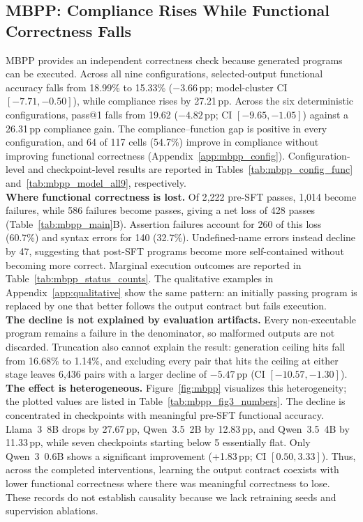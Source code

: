 \documentclass{article}
\newcommand{\pp}{\,pp}
\begin{document}
\vspace{-3mm}
\subsection{MBPP: Compliance Rises While Functional Correctness Falls}
\label{sec:mbpp}
\vspace{-2mm}
MBPP provides an independent correctness check because generated programs can
be executed. Across all nine configurations, selected-output functional
accuracy falls from 18.99\% to 15.33\% ($-3.66$\pp{}; model-cluster CI
$[-7.71,-0.50]$), while compliance rises by 27.21\pp{}. Across the six
deterministic configurations, pass@1 falls from 19.62%
($-4.82$\pp{}; CI $[-9.65,-1.05]$) against a 26.31\pp{} compliance gain.
The compliance--function gap is positive in every configuration, and 64 of
117 cells (54.7\%) improve in compliance without improving functional
correctness (Appendix~\ref{app:mbpp_config}).
Configuration-level and checkpoint-level results are reported in
Tables~\ref{tab:mbpp_config_func} and~\ref{tab:mbpp_model_all9}, respectively.
\\
\noindent\textbf{Where functional correctness is lost.}
Of 2{,}222 pre-SFT passes, 1{,}014 become failures, while 586 failures become
passes, giving a net loss of 428 passes (Table~\ref{tab:mbpp_main}B).
Assertion failures account for 260 of this loss (60.7\%) and syntax errors for
140 (32.7\%). Undefined-name errors instead decline by 47, suggesting that
post-SFT programs become more self-contained without becoming more correct.
Marginal execution outcomes are reported in Table~\ref{tab:mbpp_status_counts}.
The qualitative examples in Appendix~\ref{app:qualitative} show the same
pattern: an initially passing program is replaced by one that better follows
the output contract but fails execution.
\\
\noindent\textbf{The decline is not explained by evaluation artifacts.}
Every non-executable program remains a failure in the denominator, so malformed
outputs are not discarded. Truncation also cannot explain the result: generation
ceiling hits fall from 16.68\% to 1.14\%, and excluding every pair that hits
the ceiling at either stage leaves 6{,}436 pairs with a larger decline of
$-5.47$\pp{} (CI $[-10.57,-1.30]$).
\\
\noindent\textbf{The effect is heterogeneous.}
Figure~\ref{fig:mbpp} visualizes this heterogeneity; the plotted values are
listed in Table~\ref{tab:mbpp_fig3_numbers}.
The decline is concentrated in checkpoints with meaningful pre-SFT functional
accuracy. Llama~3~8B drops by 27.67\pp{}, Qwen~3.5~2B by 12.83\pp{}, and
Qwen~3.5~4B by 11.33\pp{}, while seven checkpoints starting below 5%
essentially flat. Only Qwen~3~0.6B shows a significant improvement
(+1.83\pp{}; CI $[0.50,3.33]$). Thus, across the completed interventions,
learning the output contract coexists with lower functional correctness where
there was meaningful correctness to lose. These records do not establish
causality because we lack retraining seeds and supervision ablations.
\end{document}
